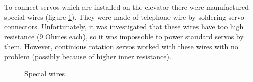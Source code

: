 To connect servos which are installed on the elevator there were manufactured special wires (figure \ref{Wiring1.1}). They were made of telephone wire by soldering servo connectors. Unfortunately, it was investigated that these wires have too high resistance (9 Ohmes each), so it was impossoble to power standard servos by them. However, continious rotation servos worked with these wires with no problem (possibly because of higher inner resistance).

\begin{figure}[H]
	\begin{minipage}[h]{1\linewidth}
		\caption{Special wires}
		\label{Wiring1.1}
	\end{minipage}
\end{figure}